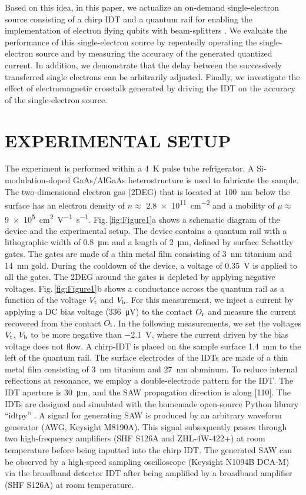 \documentclass{article}
\begin{document}
Based on this idea, in this paper, we actualize an on-demand single-electron source consisting of a chirp IDT and a quantum rail for enabling the implementation of electron flying qubits with beam-splitters \cite{Ito2021,Wang2023}. We evaluate the performance of this single-electron source by repeatedly operating the single-electron source and by measuring the accuracy of the generated quantized current. In addition, we demonstrate that the delay between the successively transferred single electrons can be arbitrarily adjusted. Finally, we investigate the effect of electromagnetic crosstalk generated by driving the IDT on the accuracy of the single-electron source.


\section{EXPERIMENTAL SETUP}
The experiment is performed within a \SI{4}{K} pulse tube refrigerator. A Si-modulation-doped GaAs/AlGaAs heterostructure is used to fabricate the sample. The two-dimensional electron gas (2DEG) that is located at \SI{100}{nm} below the surface has an electron density of  $n\approx$ \SI{2.8e11}{cm^{-2}} and a mobility of $\mu\approx$ \SI{9e5}{cm^{2}V^{-1}s^{-1}}. Fig.\,\ref{fig:Figure1}a shows a schematic diagram of the device and the experimental setup. The device contains a quantum rail with a lithographic width of \SI{0.8}{\micro m} and a length of \SI{2}{\micro m}, defined by surface Schottky gates. The gates are made of a thin metal film consisting of \SI{3}{nm} titanium and \SI{14}{nm} gold. During the cooldown of the device, a voltage of \SI{0.35}{V} is applied to all the gates. The 2DEG around the gates is depleted by applying negative voltages. Fig.\,\ref{fig:Figure1}b shows a conductance across the quantum rail as a function of the voltage $V_{\rm t}$ and $V_{\rm b}$. For this measurement, we inject a current by applying a DC bias voltage (\SI{336}{\micro V}) to the contact $O_{\rm r}$ and measure the current recovered from the contact $O_{\rm l}$. In the following measurements, we set the voltages $V_{\rm t}$, $V_{\rm b}$ to be more negative than \SI{-2.1}{V}, where the current driven by the bias voltage does not flow. A chirp-IDT is placed on the sample surface \SI{1.4}{mm} to the left of the quantum rail. The surface electrodes of the IDTs are made of a thin metal film consisting of \SI{3}{nm} titanium and \SI{27}{nm} aluminum. To reduce internal reflections at resonance, we employ a double-electrode pattern for the IDT. The IDT aperture is \SI{30}{\micro m}, and the SAW propagation direction is along [110]. The IDTs are designed and simulated with the homemade open-source Python library “idtpy” \cite{idtpy}. A signal for generating SAW is produced by an arbitrary waveform generator (AWG, Keysight M8190A). This signal subsequently passes through two high-frequency amplifiers (SHF S126A and ZHL-4W-422+) at room temperature before being inputted into the chirp IDT. The generated SAW can be observed by a high-speed sampling oscilloscope (Keysight N1094B DCA-M) via the broadband detector IDT after being amplified by a broadband amplifier (SHF S126A) at room temperature.
\end{document}
